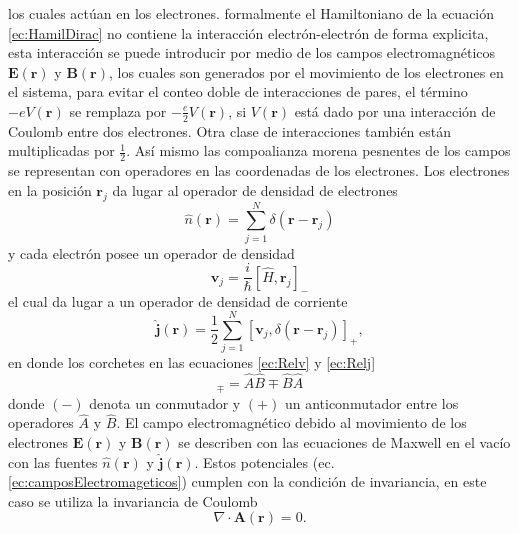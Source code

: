 \documentclass[12pt,a4paper, oneside]{book}
\begin{document}
    los cuales act\'uan en los electrones.
    \newline
    formalmente el Hamiltoniano de la ecuaci\'on \ref{ec:HamilDirac} no contiene la interacci\'on electr\'on-electr\'on de forma explicita, esta interacci\'on se puede introducir  por medio de los campos electromagn\'eticos $\pmb{E} (\pmb{r})$ y $\pmb{B} (\pmb{r})$, los cuales son generados por el movimiento de los electrones en el sistema, para evitar el conteo doble de interacciones de pares, el t\'ermino $-e V (\pmb{r})$ se remplaza por $-\frac{e}{2} V(\pmb{r})$, si $V (\pmb{r})$ est\'a dado por  una interacci\'on de Coulomb entre dos electrones. Otra clase de interacciones tambi\'en est\'an multiplicadas por $\frac{1}{2}$. As\'i mismo las compoalianza morena pesnentes de los campos se representan con operadores en las coordenadas de los electrones.
    \newline
    Los electrones en la posici\'on $\pmb{r}_j$ da lugar al operador de densidad de electrones
    \begin{equation}
    \hat{n} (\pmb{r}) = \sum_{j=1}^{N} \delta (\pmb{r}- \pmb{r}_j) \label{ec:Reln}
    \end{equation}
    y cada electr\'on posee un operador de densidad
    \begin{equation}
    \pmb{v}_j = \frac{i}{\hbar} [\hat{H},\pmb{r}_j]_- \label{ec:Relv}
    \end{equation}
    el cual da lugar a un operador de densidad de corriente
    \begin{equation}
    \hat{\pmb{j}} (\pmb{r}) = \frac{1}{2} \sum_{j=1}^{N} [\pmb{v}_j, \delta (\pmb{r}-\pmb{r}_j)]_+ , \label{ec:Relj}
    \end{equation}
    en donde los corchetes en las ecuaciones \ref{ec:Relv} y \ref{ec:Relj} 
    \begin{equation}
    [\hat{A},\hat{B}]_{\mp} = \hat{A} \hat{B} \mp \hat{B} \hat{A} \label{ec:conm}
    \end{equation} 
    donde $(-)$ denota un conmutador y  $(+)$ un anticonmutador entre los operadores $\hat{A}$ y $\hat{B}$.
    \newline
    El campo electromagn\'etico debido al movimiento de los electrones $\pmb{E} (\pmb{r})$ y $\pmb{B} (\pmb{r})$ se describen con las ecuaciones de Maxwell en el vac\'io con las fuentes $\hat{n} (\pmb{r})$ y $\pmb{\hat{j}} (\pmb{r})$. Estos potenciales (ec. \ref{ec:camposElectromageticos}) cumplen con la condici\'on de invariancia, en este caso se utiliza la invariancia de Coulomb
    \begin{equation}
    \nabla \cdot \pmb{A} (\pmb{r}) = 0. \label{ec:CoulombGauge}
    \end{equation}
\end{document}
